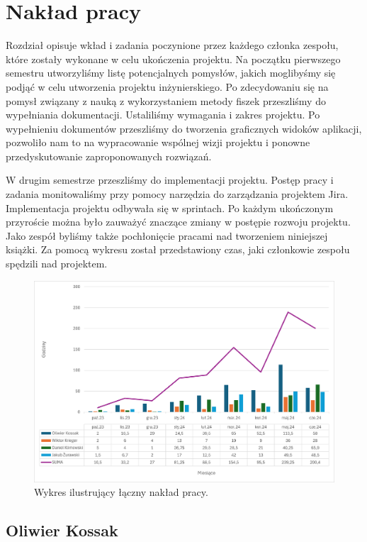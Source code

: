 \chapter{Nakład pracy}

Rozdział opisuje wkład i zadania poczynione przez każdego członka zespołu, które zostały wykonane w celu ukończenia projektu. Na początku pierwszego semestru utworzyliśmy listę potencjalnych pomysłów, jakich moglibyśmy się podjąć w celu utworzenia projektu inżynierskiego. Po zdecydowaniu się na pomysł związany z nauką z wykorzystaniem metody fiszek przeszliśmy do wypełniania dokumentacji. Ustaliliśmy wymagania i zakres projektu. Po wypełnieniu dokumentów przeszliśmy do tworzenia graficznych widoków aplikacji, pozwoliło nam to na wypracowanie wspólnej wizji projektu i ponowne przedyskutowanie zaproponowanych rozwiązań.


\indent W drugim semestrze przeszliśmy do implementacji projektu. Postęp pracy i zadania monitowaliśmy przy pomocy narzędzia do zarządzania projektem Jira. Implementacja projektu odbywała się w sprintach. Po każdym ukończonym przyroście można było zauważyć znaczące zmiany w postępie rozwoju projektu. Jako zespół byliśmy także pochłonięcie pracami nad tworzeniem niniejszej książki. Za pomocą wykresu został przedstawiony czas, jaki członkowie zespołu spędzili nad projektem.

\begin{figure}[H]
    \centering
    \includegraphics[width=1\textwidth]{chapters/chapter_11/naklad_pracy_wykres}
    \caption{Wykres ilustrujący łączny nakład pracy.}
    \label{img:wykres_nakładu_pracy}
\end{figure}

\section{Oliwier Kossak}

